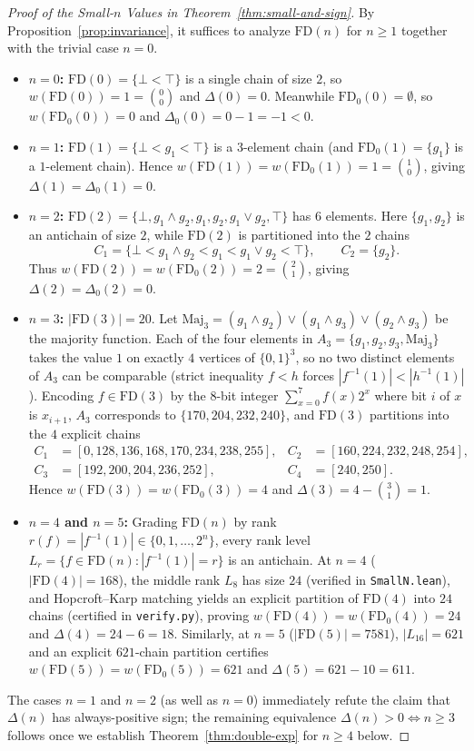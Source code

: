 \documentclass[11pt]{article}
\theoremstyle{definition}
\newcommand{\FD}{\mathrm{FD}}
\newcommand{\FDz}{\mathrm{FD}_0}
\newcommand{\Maj}{\mathrm{Maj}}
\begin{document}
\begin{proof}[Proof of the Small-$n$ Values in Theorem~\ref{thm:small-and-sign}]
By Proposition~\ref{prop:invariance}, it suffices to analyze $\FD(n)$ for $n \ge 1$ together with the trivial case $n = 0$.
\begin{itemize}
  \item \textbf{$n = 0$:} $\FD(0) = \{\bot < \top\}$ is a single chain of size $2$, so $w(\FD(0)) = 1 = \binom{0}{0}$ and $\Delta(0) = 0$. Meanwhile $\FDz(0) = \emptyset$, so $w(\FDz(0)) = 0$ and $\Delta_0(0) = 0 - 1 = -1 < 0$.
  \item \textbf{$n = 1$:} $\FD(1) = \{\bot < g_1 < \top\}$ is a $3$-element chain (and $\FDz(1) = \{g_1\}$ is a $1$-element chain). Hence $w(\FD(1)) = w(\FDz(1)) = 1 = \binom{1}{0}$, giving $\Delta(1) = \Delta_0(1) = 0$.
  \item \textbf{$n = 2$:} $\FD(2) = \{\bot, g_1 \wedge g_2, g_1, g_2, g_1 \vee g_2, \top\}$ has $6$ elements. Here $\{g_1, g_2\}$ is an antichain of size $2$, while $\FD(2)$ is partitioned into the $2$ chains
  \[
    C_1 = \{\bot < g_1 \wedge g_2 < g_1 < g_1 \vee g_2 < \top\}, \qquad C_2 = \{g_2\}.
  \]
  Thus $w(\FD(2)) = w(\FDz(2)) = 2 = \binom{2}{1}$, giving $\Delta(2) = \Delta_0(2) = 0$.
  \item \textbf{$n = 3$:} $|\FD(3)| = 20$. Let $\Maj_3 = (g_1 \wedge g_2) \vee (g_1 \wedge g_3) \vee (g_2 \wedge g_3)$ be the majority function. Each of the four elements in $A_3 = \{g_1, g_2, g_3, \Maj_3\}$ takes the value $1$ on exactly $4$ vertices of $\{0,1\}^3$, so no two distinct elements of $A_3$ can be comparable (strict inequality $f < h$ forces $|f^{-1}(1)| < |h^{-1}(1)|$). Encoding $f \in \FD(3)$ by the $8$-bit integer $\sum_{x=0}^7 f(x) 2^x$ where bit $i$ of $x$ is $x_{i+1}$, $A_3$ corresponds to $\{170, 204, 232, 240\}$, and $\FD(3)$ partitions into the $4$ explicit chains
  \begin{align*}
    C_1 &= [0, 128, 136, 168, 170, 234, 238, 255], &
    C_2 &= [160, 224, 232, 248, 254], \\
    C_3 &= [192, 200, 204, 236, 252], &
    C_4 &= [240, 250].
  \end{align*}
  Hence $w(\FD(3)) = w(\FDz(3)) = 4$ and $\Delta(3) = 4 - \binom{3}{1} = 1$.
  \item \textbf{$n = 4$ and $n = 5$:} Grading $\FD(n)$ by rank $r(f) = |f^{-1}(1)| \in \{0, 1, \dots, 2^n\}$, every rank level $L_r = \{f \in \FD(n) : |f^{-1}(1)| = r\}$ is an antichain. At $n = 4$ ($|\FD(4)| = 168$), the middle rank $L_8$ has size $24$ (verified in \texttt{SmallN.lean}), and Hopcroft--Karp matching yields an explicit partition of $\FD(4)$ into $24$ chains (certified in \texttt{verify.py}), proving $w(\FD(4)) = w(\FDz(4)) = 24$ and $\Delta(4) = 24 - 6 = 18$. Similarly, at $n = 5$ ($|\FD(5)| = 7581$), $|L_{16}| = 621$ and an explicit $621$-chain partition certifies $w(\FD(5)) = w(\FDz(5)) = 621$ and $\Delta(5) = 621 - 10 = 611$.
\end{itemize}
The cases $n = 1$ and $n = 2$ (as well as $n = 0$) immediately refute the claim that $\Delta(n)$ has always-positive sign; the remaining equivalence $\Delta(n) > 0 \iff n \ge 3$ follows once we establish Theorem~\ref{thm:double-exp} for $n \ge 4$ below.
\end{proof}
\end{document}
